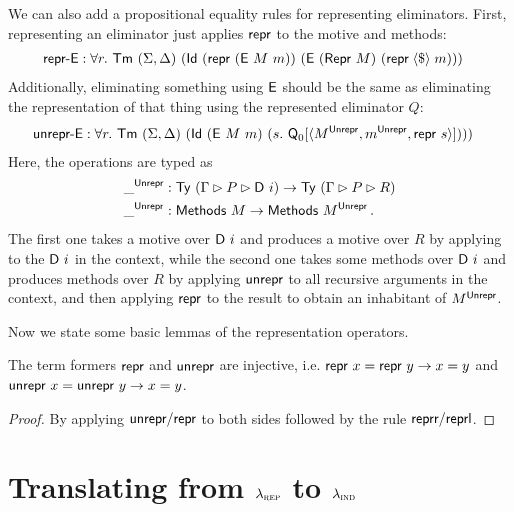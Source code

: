 We can also add a propositional equality rules for representing eliminators.
First, representing an eliminator just applies $\textsf{repr}$ to the motive and methods:
\begin{align*}
&\mta{repr-E} : \forall r.\ \Tm\ (\Sigma, \Delta)\ (\mta{Id}\ (\Mrepr\ (\mta{E}\ M\ m))\ (\mta{E}\ (\mta{Repr}\ M)\ (\mta{repr} \fmap m)))
\end{align*}
Additionally, eliminating something using $\textsf{E}$ should be the same as
eliminating the representation of that thing using the represented eliminator $Q$:
\begin{align*}
&\mta{unrepr-E} : \forall r.\ \Tm\ (\Sigma, \Delta)\ (\mta{Id}\ (\mta{E}\ M\ m)\ (s.\ \mta{Q}_0[\Msub{M^{\mta{Unrepr}}, m^{\mta{Unrepr}}, \mta{repr}\ s}])))
\end{align*}
Here, the  operations are typed as
\begin{align*}
&\_^{\mta{Unrepr}} : \Ty\ (\Gamma \rhd P \rhd \mta{D}\ i) \to \Ty\ (\Gamma \rhd P \rhd R) \\
&\_^{\mta{Unrepr}} : \mta{Methods}\ M \to \mta{Methods}\ M^{\mta{Unrepr}}\,.
\end{align*}
The first one takes a motive over $\textsf{D}\ i$ and produces a motive over $R$ by applying
 to the $\textsf{D}\ i$ in the context, while the second one takes some
methods over $\textsf{D}\ i$ and produces methods over $R$ by applying
$\textsf{unrepr}$ to all recursive arguments in the context, and then applying
$\textsf{repr}$ to the result to obtain an inhabitant of $M^{\textsf{Unrepr}}$.

Now we state some basic lemmas of the representation operators.

\begin{lemma}
	The term formers $\textsf{repr}{}$ and $\textsf{unrepr}{}$ are injective, i.e.
	$\textsf{repr}\ x = \textsf{repr}\ y \to x = y$ and $\textsf{unrepr}\ x = \textsf{unrepr}\ y \to x = y$.
	\begin{proof}
				By applying $\textsf{unrepr}/\textsf{repr}$ to both sides
				followed by the rule $\textsf{reprr}/\textsf{reprl}$.
	\end{proof}
\end{lemma}

\section{Translating from $\lambda_{\textsc{rep}}$ to $\lambda_{\textsc{ind}}$}

